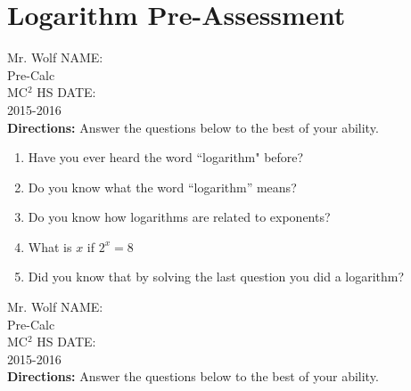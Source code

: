 \documentclass[12pt]{article}
\begin{document}
\pagebreak

\section{Logarithm Pre-Assessment}

Mr. Wolf \hfill NAME:\underline{\hspace{3in}}\\ 
Pre-Calc \\ 
MC$^2$ HS \hfill DATE:\underline{\hspace{2in}}\\
2015-2016\\

\textbf{Directions:} Answer the questions below to the best of your ability.

\begin{enumerate}
	\item Have you ever heard the word ``logarithm" before?\\
	
	\item Do you know what the word ``logarithm'' means?\\
	
	\item Do you know how logarithms are related to exponents?\\
	

	\item What is $x$ if $2^{x}=8$\\

	
	\item Did you know that by solving the last question you did a logarithm?\\

\end{enumerate}

\vspace{1cm}

Mr. Wolf \hfill NAME:\underline{\hspace{3in}}\\ 
Pre-Calc \\ 
MC$^2$ HS \hfill DATE:\underline{\hspace{2in}}\\
2015-2016\\

\textbf{Directions:} Answer the questions below to the best of your ability.
\end{document}
